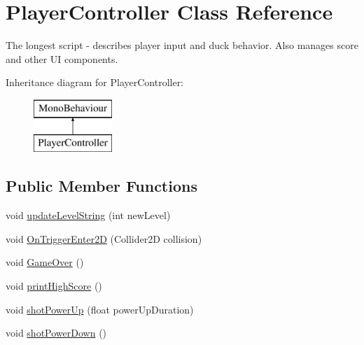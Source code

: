 \hypertarget{class_player_controller}{}\section{Player\+Controller Class Reference}
\label{class_player_controller}


The longest script -\/ describes player input and duck behavior. Also manages score and other UI components.  


Inheritance diagram for Player\+Controller\+:\begin{figure}[H]
\begin{center}
\leavevmode
\includegraphics[height=2.000000cm]{class_player_controller}
\end{center}
\end{figure}
\subsection*{Public Member Functions}
\begin{DoxyCompactItemize}
\item 
void \mbox{\hyperlink{class_player_controller_a201205acdeda463736f868b6f20f05a3}{update\+Level\+String}} (int new\+Level)
\item 
void \mbox{\hyperlink{class_player_controller_a9cb907e7cb020bfa04ef52f158aa6fcb}{On\+Trigger\+Enter2D}} (Collider2D collision)
\item 
void \mbox{\hyperlink{class_player_controller_a022c877a529497a8fdb3fcf7e21cf090}{Game\+Over}} ()
\item 
void \mbox{\hyperlink{class_player_controller_a685b3e7478ec3431f858455832c45527}{print\+High\+Score}} ()
\item 
void \mbox{\hyperlink{class_player_controller_acbd4651a9689e6e27538e149b0e3f2a9}{shot\+Power\+Up}} (float power\+Up\+Duration)
\item 
void \mbox{\hyperlink{class_player_controller_a5d6e6be056b9cc9f2db7195e633bdd4c}{shot\+Power\+Down}} ()
\end{DoxyCompactItemize}
